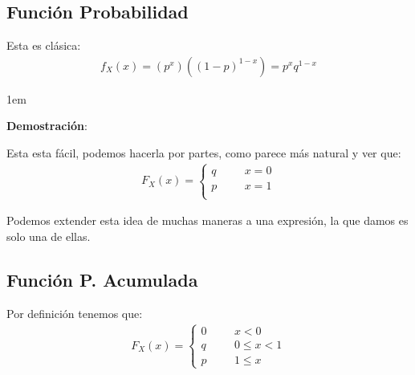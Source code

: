\documentclass[12pt, fleqn]{report}                             %
\newenvironment{SmallIndentation}[1][0.75em]                    %
        {\begin{adjustwidth}{#1}{}\begin{footnotesize}}             %
        {\end{footnotesize}\end{adjustwidth}}                       %
\DeclareMathOperator \Space     {\quad}                         %
\theoremstyle{break}                                            %
\begin{document}
            \subsection{Función Probabilidad}

                Esta es clásica:
                \begin{align*}
                    f_X(x) = (p^x) ((1-p)^{1-x}) = p^x q^{1-x}
                \end{align*}

                \begin{SmallIndentation}[1em]
                    \textbf{Demostración}:
                    
                    Esta esta fácil, podemos hacerla por partes, como parece
                    más natural y ver que:
                    \begin{align*}
                        F_X(x) = 
                            \begin{cases}
                                q \Space& x = 0             \\
                                p \Space& x = 1             \\
                            \end{cases}
                    \end{align*}

                    Podemos extender esta idea de muchas maneras a una expresión,
                    la que damos es solo una de ellas.
                
                \end{SmallIndentation}
                    
            \vspace{1em}
            \subsection{Función P. Acumulada}

                Por definición tenemos que:
                \begin{align*}
                    F_X(x) = 
                        \begin{cases}
                            0 \Space& x < 0             \\
                            q \Space& 0 \leq x < 1      \\
                            p \Space& 1 \leq x 
                        \end{cases}
                \end{align*}
\end{document}
